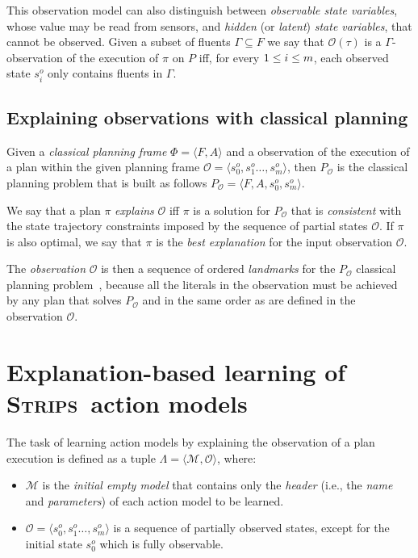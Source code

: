 \documentclass[runningheads]{llncs}
\newcommand{\tup}[1]{{\langle #1 \rangle}}
\newcommand{\strips}{\textsc{Strips}}     %
\begin{document}
This observation model can also distinguish between {\em observable state variables}, whose value may be read from sensors, and {\em hidden} (or {\em latent}) {\em state variables}, that cannot be observed. Given a subset of fluents $\Gamma\subseteq F$ we say that $\mathcal{O}(\tau)$ is a $\Gamma$-observation of the execution of $\pi$ on $P$ iff, for every ${\small 1\leq i\leq m}$, each observed state $s_i^o$ only contains fluents in $\Gamma$.

\subsection{Explaining observations with classical planning}
Given a {\em classical planning frame} $\Phi=\tup{F,A}$ and a observation of the execution of a plan within the given planning frame $\mathcal{O}=\tup{s_0^o,s_1^o \ldots , s_m^o}$, then $P_\mathcal{O}$ is the classical planning problem that is built as follows $P_\mathcal{O}=\tup{F,A,s_0^o,s_m^o}$. 

\begin{definition}[Explanation]
We say that a plan $\pi$ {\em explains} $\mathcal{O}$ iff $\pi$ is a solution for $P_\mathcal{O}$ that is {\em consistent} with the state trajectory constraints imposed by the sequence of partial states $\mathcal{O}$. If $\pi$ is also optimal, we say that $\pi$ is the {\em best explanation} for the input observation $\mathcal{O}$.
\end{definition}

The {\em observation} $\mathcal{O}$ is then a sequence of ordered {\em landmarks} for the $P_\mathcal{O}$ classical planning problem~\cite{hoffmann2004ordered}, because all the literals in the observation must be achieved by any plan that solves $P_\mathcal{O}$ and in the same order as are defined in the observation $\mathcal{O}$.


\section{Explanation-based learning of \strips\ action models}
The task of learning action models by explaining the observation of a plan execution is defined as a tuple $\Lambda=\tup{\mathcal{M},{\mathcal O}}$, where:

\begin{itemize}
\item $\mathcal{M}$ is the {\em initial empty model} that contains only the {\em header} (i.e., the {\em name} and {\em parameters}) of each action model to be learned.
\item $\mathcal{O}=\tup{s_0^o,s_1^o \ldots , s_m^o}$ is a sequence of partially observed states, except for the initial state $s_0^o$ which is fully observable.
\end{itemize}
\end{document}
